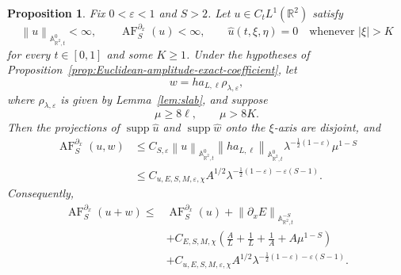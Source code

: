 \documentclass[12pt,reqno,letterpaper]{amsart}
\numberwithin{equation}{section}
\newtheorem{proposition}[theorem]{Proposition}
\theoremstyle{definition}
\newcommand{\R}{\mathbb R}
\newcommand{\A}{\mathbb A}
\newcommand{\eps}{\varepsilon}
\newcommand{\la}{\lambda}
\newcommand{\supp}{\operatorname{supp}}
\newcommand{\norm}[1]{\left\lVert #1\right\rVert}
\newcommand{\abs}[1]{\left\lvert #1\right\rvert}
\begin{document}
\begin{proposition}
\label{prop:Euclidean-mixed-absolute}
Fix $0<\eps<1$ and $S>2$.  Let $u\in C_tL^1(\R^2)$ satisfy
\[
   \norm{u}_{\A^0_{\R^2,t}}<\infty,
   \qquad
   \operatorname{AF}^{\partial_x}_S(u)<\infty,
   \qquad
   \widehat u(t,\xi,\eta)=0\quad\text{whenever }\abs\xi>K
\]
for every $t\in[0,1]$ and some $K\geq1$.  Under the hypotheses of
Proposition~\ref{prop:Euclidean-amplitude-exact-coefficient}, let
\[
   w=h a_{L,\ell}\rho_{\la,\eps},
\]
where $\rho_{\la,\eps}$ is given by Lemma~\ref{lem:slab}, and suppose
\begin{equation}\label{eq:Euclidean-mixed-separation}
   \mu\geq8\ell,
   \qquad
   \mu>8K.
\end{equation}
Then the projections of $\supp\widehat u$ and $\supp\widehat w$ onto the
$\xi$-axis are disjoint, and
\begin{equation}\label{eq:Euclidean-mixed-absolute}
\begin{split}
 \operatorname{AF}^{\partial_x}_S(u,w)
 &\leq C_{S,\eps}
   \norm{u}_{\A^0_{\R^2,t}}
   \norm{h a_{L,\ell}}_{\A^0_{\R^2,t}}
   \la^{-\frac12(1-\eps)}\mu^{1-S}\\
 &\leq C_{u,E,S,M,\eps,\chi}A^{1/2}
   \la^{-\frac12(1-\eps)-\eps(S-1)}.
\end{split}
\end{equation}
Consequently,
\begin{equation}\label{eq:Euclidean-combined-absolute}
\begin{split}
 \operatorname{AF}^{\partial_x}_S(u+w)
 \leq{}&\operatorname{AF}^{\partial_x}_S(u)
   +\norm{\partial_xE}_{\A^{-S}_{\R^2,t}}\\
 &+C_{E,S,M,\chi}\left(
       \frac A L+\frac1L+\frac1A+A\mu^{1-S}\right)\\
 &+C_{u,E,S,M,\eps,\chi}A^{1/2}
   \la^{-\frac12(1-\eps)-\eps(S-1)}.
\end{split}
\end{equation}
\end{proposition}
\end{document}
